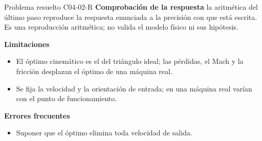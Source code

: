 \documentclass[10pt,openany]{book}
\begin{document}
\begin{studiumworked}{Problema resuelto C04-02-R}
\noindent\textbf{Comprobación de la respuesta} la aritmética del último paso reproduce la respuesta enunciada a la precisión con que está escrita. Es una reproducción aritmética; no valida el modelo físico ni sus hipótesis.

\noindent\textbf{Limitaciones}
\begin{itemize}
\item El óptimo cinemático es el del triángulo ideal; las pérdidas, el Mach y la fricción desplazan el óptimo de una máquina real.
\item Se fija la velocidad y la orientación de entrada; en una máquina real varían con el punto de funcionamiento.
\end{itemize}

\noindent\textbf{Errores frecuentes}
\begin{itemize}
\item Suponer que el óptimo elimina toda velocidad de salida.
\end{itemize}
\end{studiumworked}
\end{document}
